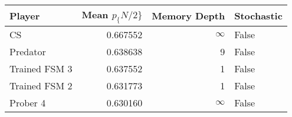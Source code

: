 \begin{tabular}{lrrl}
\toprule
        Player &  Mean $p_\{N/2\}$ &  Memory Depth & Stochastic \\
\midrule
            CS &        0.667552 &            \(\infty\) &      False \\
      Predator &        0.638638 &             9 &      False \\
 Trained FSM 3 &        0.637552 &             1 &      False \\
 Trained FSM 2 &        0.631773 &             1 &      False \\
      Prober 4 &        0.630160 &            \(\infty\) &      False \\
\bottomrule
\end{tabular}
